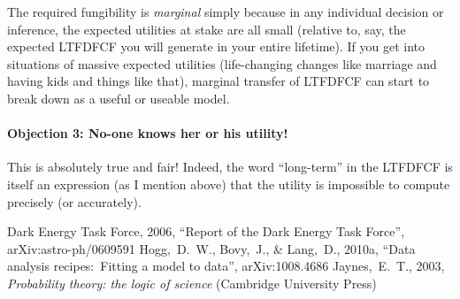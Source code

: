 \documentclass[12pt,twoside,pdftex]{article}
\begin{document}
The required fungibility is \emph{marginal} simply because in any
individual decision or inference, the expected utilities at stake are
all small (relative to, say, the expected LTFDFCF you will generate in
your entire lifetime).  If you get into situations of massive expected
utilities (life-changing changes like marriage and having kids and
things like that), marginal transfer of LTFDFCF can start to break
down as a useful or useable model.

\paragraph{Objection 3: No-one knows her or his utility!}
This is absolutely true and fair!  Indeed, the word ``long-term'' in
the LTFDFCF is itself an expression (as I mention above) that the
utility is impossible to compute precisely (or accurately).

\clearpage
{}\theendnotes

\clearpage
\begin{thebibliography}{}\raggedright
{}
  Dark Energy Task Force, 2006,
  ``Report of the Dark Energy Task Force'', arXiv:astro-ph/0609591
  Hogg,~D.~W., Bovy,~J., \& Lang,~D., 2010a,
  ``Data analysis recipes:\ Fitting a model to data'', arXiv:1008.4686
  Jaynes,~E.~T., 2003,
  \textit{Probability theory: the logic of science} (Cambridge University Press)
\end{thebibliography}
\end{document}
